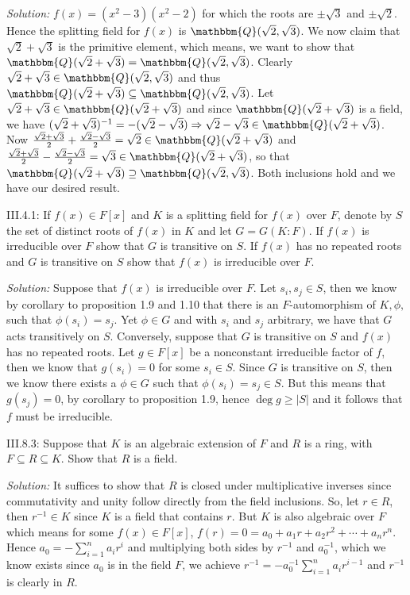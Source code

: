 \documentclass{letter}
\newcommand{\tmem}[1]{{\em #1\/}}
\begin{document}
{\tmem{Solution:}} $f (x) = (x^2 - 3) (x^2 - 2)$ for which the roots are $\pm
\sqrt{3}$ and $\pm \sqrt{2}$. Hence the splitting field for $f (x)$ is
$\mathbbm{Q}( \sqrt{2}, \sqrt{3})$. We now claim that $\sqrt{2} + \sqrt{3}$ is
the primitive element, which means, we want to show that $\mathbbm{Q}(
\sqrt{2} + \sqrt{3}) =\mathbbm{Q}( \sqrt{2}, \sqrt{3})$. Clearly $\sqrt{2} +
\sqrt{3} \in \mathbbm{Q}( \sqrt{2}, \sqrt{3})$ and thus $\mathbbm{Q}( \sqrt{2}
+ \sqrt{3}) \subseteq \mathbbm{Q}( \sqrt{2}, \sqrt{3})$. Let $\sqrt{2} +
\sqrt{3} \in \mathbbm{Q}( \sqrt{2} + \sqrt{3})$ and since $\mathbbm{Q}(
\sqrt{2} + \sqrt{3})$ is a field, we have $( \sqrt{2} + \sqrt{3})^{- 1} = - (
\sqrt{2} - \sqrt{3}) \Rightarrow \sqrt{2} - \sqrt{3} \in \mathbbm{Q}( \sqrt{2}
+ \sqrt{3})$. Now $\frac{\sqrt{2} + \sqrt{3}}{2} + \frac{\sqrt{2} -
\sqrt{3}}{2} = \sqrt{2} \in \mathbbm{Q}( \sqrt{2} + \sqrt{3})$ and
$\frac{\sqrt{2} + \sqrt{3}}{2} - \frac{\sqrt{2} - \sqrt{3}}{2} = \sqrt{3} \in
\mathbbm{Q}( \sqrt{2} + \sqrt{3})$, so that $\mathbbm{Q}( \sqrt{2} + \sqrt{3})
\supseteq \mathbbm{Q}( \sqrt{2}, \sqrt{3})$. Both inclusions hold and we have
our desired result.

III.4.1: If $f (x) \in F [x]$ and $K$ is a splitting field for $f (x)$ over
$F$, denote by $S$ the set of distinct roots of $f (x)$ in $K$ and let $G = G
(K : F)$. If $f (x)$ is irreducible over $F$ show that $G$ is transitive on
$S$. If $f (x)$ has no repeated roots and $G$ is transitive on $S$ show that
$f (x)$ is irreducible over $F$.

{\tmem{Solution:}} Suppose that $f (x)$ is irreducible over $F$. Let $s_i, s_j
\in S$, then we know by corollary to proposition 1.9 and 1.10 that there is an
$F$-automorphism of $K, \phi,$ such that $\phi (s_i) = s_j$. Yet $\phi \in G$
and with $s_i$ and $s_j$ arbitrary, we have that $G$ acts transitively on $S$.
Conversely, suppose that $G$ is transitive on $S$ and $f (x)$ has no repeated
roots. Let $g \in F [x]$ be a nonconstant irreducible factor of $f$, then we
know that $g (s_i) = 0$ for some $s_i \in S$. Since $G$ is transitive on $S$,
then we know there exists a $\phi \in G$ such that $\phi (s_i) = s_j \in S$.
But this means that $g (s_j) = 0$, by corollary to proposition 1.9, hence
$\deg g \geq |S|$ and it follows that $f$ must be irreducible.

III.8.3: Suppose that $K$ is an algebraic extension of $F$ and $R$ is a ring,
with $F \subseteq R \subseteq K$. Show that $R$ is a field.

{\tmem{Solution:}} It suffices to show that $R$ is closed under multiplicative
inverses since commutativity and unity follow directly from the field
inclusions. So, let $r \in R$, then $r^{- 1} \in K$ since $K$ is a field that
contains $r$. But $K$ is also algebraic over $F$ which means for some $f (x)
\in F [x]$, $f (r) = 0 = a_0 + a_1 r + a_2 r^2 + \cdots + a_n r^n$. Hence $a_0
= - \sum^n_{i = 1} a_i r^i$ and multiplying both sides by $r^{- 1}$ and
$a_0^{- 1}$, which we know exists since $a_0$ is in the field $F$, we achieve
$r^{- 1} = - a^{- 1}_0 \sum^n_{i = 1} a_i r^{i - 1}$ and $r^{- 1}$ is clearly
in $R$.
\end{document}
